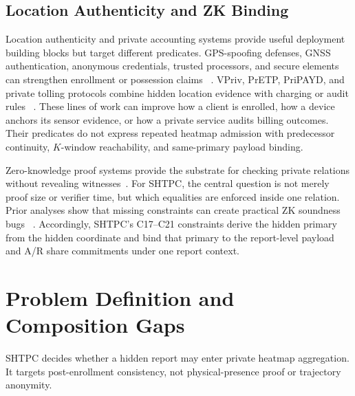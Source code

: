 \documentclass[journal]{IEEEtran}
\theoremstyle{definition}
\theoremstyle{plain}
\begin{document}
\subsection{Location Authenticity and ZK Binding}
\label{sec:related-location-authenticity}

Location authenticity and private accounting systems provide useful deployment
building blocks but target different predicates. GPS-spoofing defenses,
GNSS authentication, anonymous credentials, trusted processors, and secure
elements can strengthen enrollment or possession claims
~\cite{Tippenhauer2011GPS,Psiaki2016GNSS,galileo-osnma-2023,Shokri2011Quantifying,Shokri2012Optimal,Rosenberg2023ZKCreds,Rathee2022Zebra,Allen2019SGXDP}.
VPriv, PrETP, PriPAYD, and private tolling protocols combine hidden location
evidence with charging or audit rules
~\cite{Popa2009VPriv,Balasch2010PrETP,Troncoso2011PriPAYD,Day2011SPEcTRe,Meiklejohn2011Milo,deJonge2008Commits,Garcia2013CellBased}.
These lines of work can improve how a client is enrolled, how a device anchors
its sensor evidence, or how a private service audits billing outcomes. Their
predicates do not express repeated heatmap admission with predecessor
continuity, \(K\)-window reachability, and same-primary payload binding.

Zero-knowledge proof systems provide the substrate for checking private
relations without revealing witnesses~\cite{Goldwasser1989ZK,BenSasson2014SNARKs,Parno2013Pinocchio,Sasson2014Zerocash,Groth2016pairing,Gabizon2019PLONK,BenSasson2019Aurora,Setty2020Spartan,Kothapalli2022Nova,Bunz2018Bulletproofs,Wahby2018Doubly,Kate2010KZG,Grassi2021Poseidon,Albrecht2016MiMC,Grassi2022RC}.
For SHTPC, the central question is not merely proof size or verifier time, but
which equalities are enforced inside one relation. Prior analyses show that
missing constraints can create practical ZK soundness bugs
~\cite{Wen2024ZKCircuit}. Accordingly, \textsc{SHTPC}'s C17--C21 constraints
derive the hidden primary from the hidden coordinate and bind that primary to
the report-level payload and A/R share commitments under one report context.


\section{Problem Definition and Composition Gaps}
\label{sec:prelim}

\textsc{SHTPC} decides whether a hidden report may enter private heatmap
aggregation. It targets post-enrollment consistency, not physical-presence
proof or trajectory anonymity.
\end{document}
